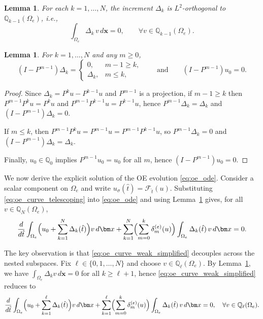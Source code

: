 \documentclass[fleqn,11pt]{amsart}
\newtheorem{lemma}[theorem]{Lemma}
\begin{document}
\begin{lemma}
\label{lemma:oe_orthogonality}
For each $k=1,\dots,N$, the increment $\Delta_k$ is $L^2$-orthogonal
to $\mathbb Q_{k-1}(\Omega_e)$, i.e.,
\[
\int_{\Omega_e} \Delta_k\, v \, d\bm x = 0,
\qquad \forall v\in \mathbb Q_{k-1}(\Omega_e).
\]
\end{lemma}

\begin{lemma}
\label{lemma:oe_projection_action}
For $k=1,\dots,N$ and any $m\ge 0$,
\[
(I-P^{m-1})\Delta_k =
\begin{cases}
0, & m-1 \ge k,\\
\Delta_k, & m \le k,
\end{cases}
\qquad\text{and}\qquad
(I-P^{m-1})u_0 = 0.
\]
\end{lemma}

\begin{proof}
Since $\Delta_k = P^k u - P^{k-1}u$ and $P^{m-1}$ is a projection,
if $m-1\ge k$ then $P^{m-1}P^k u=P^k u$ and $P^{m-1}P^{k-1}u=P^{k-1}u$,
hence $P^{m-1}\Delta_k=\Delta_k$ and $(I-P^{m-1})\Delta_k=0$.

If $m\le k$, then $P^{m-1}P^k u=P^{m-1}u=P^{m-1}P^{k-1}u$, so
$P^{m-1}\Delta_k=0$ and $(I-P^{m-1})\Delta_k=\Delta_k$.

Finally, $u_0\in\mathbb Q_0$ implies $P^{m-1}u_0=u_0$ for all $m$,
hence $(I-P^{m-1})u_0=0$.
\end{proof}

\medskip
We now derive the explicit solution of the OE evolution
\eqref{eq:oe_ode}. Consider a scalar component on $\Omega_e$ and write
$u_\sigma(\hat t)=\mathcal F_{\hat t}(u)$.
Substituting \eqref{eq:oe_curve_telescoping} into \eqref{eq:oe_ode}
and using Lemma~\ref{lemma:oe_projection_action} gives, for all
$v\in\mathbb Q_N(\Omega_e)$,
\begin{equation}
\label{eq:oe_curve_weak_simplified}
\frac{d}{d\hat t}\int_{\Omega_e}
\Bigl(u_0+\sum_{k=1}^N \Delta_k(\hat t)\Bigr)v\,d\bm x
+
\sum_{k=1}^N
\Bigl(\sum_{m=0}^k \delta_m^{(e)}(u)\Bigr)
\int_{\Omega_e}\Delta_k(\hat t)\,v\,d\bm x
=0.
\end{equation}

The key observation is that \eqref{eq:oe_curve_weak_simplified}
decouples across the nested subspaces. Fix $\ell\in\{0,1,\dots,N\}$ and
choose $v\in\mathbb Q_\ell(\Omega_e)$. By
Lemma~\ref{lemma:oe_orthogonality}, we have
$\int_{\Omega_e}\Delta_k v\,d\bm x=0$ for all $k\ge \ell+1$, hence
\eqref{eq:oe_curve_weak_simplified} reduces to
\begin{equation}
\label{eq:oe_curve_restricted}
\frac{d}{d\hat t}\int_{\Omega_e}
\Bigl(u_0+\sum_{k=1}^{\ell} \Delta_k(\hat t)\Bigr)v\,d\bm x
+
\sum_{k=1}^{\ell}
\Bigl(\sum_{m=0}^k \delta_m^{(e)}(u)\Bigr)
\int_{\Omega_e}\Delta_k(\hat t)\,v\,d\bm x
=0,
\quad \forall v\in\mathbb Q_\ell(\Omega_e).
\end{equation}
\end{document}
